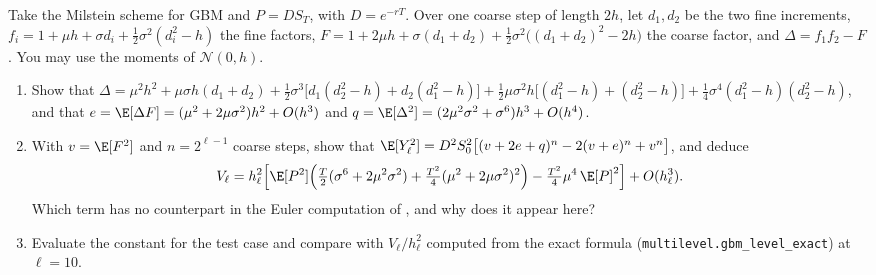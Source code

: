 \begin{exercise}\label{ex:ml-milstein-exact}
\hard Take the Milstein scheme for GBM and $P=DS_T$, with $D=e^{-rT}$. Over one coarse step of
length $2h$, let $d_1,d_2$ be the two fine increments, $f_i=1+\mu h+\sigma d_i+\frac12\sigma^2(d_i^2-h)$
the fine factors, $F=1+2\mu h+\sigma(d_1+d_2)+\frac12\sigma^2\big((d_1+d_2)^2-2h\big)$ the coarse
factor, and $\Delta=f_1f_2-F$. You may use the moments of $\mathcal N(0,h)$.
\begin{enumerate}[label=(\alph*)]
  \item Show that
    $\Delta=\mu^2h^2+\mu\sigma h(d_1+d_2)+\frac12\sigma^3\big[d_1(d_2^2-h)+d_2(d_1^2-h)\big]
    +\frac12\mu\sigma^2h\big[(d_1^2-h)+(d_2^2-h)\big]+\frac14\sigma^4(d_1^2-h)(d_2^2-h)$, and that
    $e=\E[\Delta F]=(\mu^2+2\mu\sigma^2)h^2+O(h^3)$ and $q=\E[\Delta^2]=(2\mu^2\sigma^2+\sigma^6)h^3+O(h^4)$.
  \item With $v=\E[F^2]$ and $n=2^{\ell-1}$ coarse steps, show that
    $\E[Y_\ell^2]=D^2S_0^2\big[(v+2e+q)^n-2(v+e)^n+v^n\big]$, and deduce
    \[
      V_\ell=h_\ell^2\Big[\E[P^2]\Big(\tfrac T2(\sigma^6+2\mu^2\sigma^2)+\tfrac{T^2}4(\mu^2+2\mu\sigma^2)^2\Big)
      -\tfrac{T^2}4\mu^4\,\E[P]^2\Big]+O(h_\ell^3).
    \]
    Which term has no counterpart in the Euler computation of , and why
    does it appear here?
  \item Evaluate the constant for the test case and compare with $V_\ell/h_\ell^2$ computed from the
    exact formula (\texttt{multilevel.gbm\_level\_exact}) at $\ell=10$.
\end{enumerate}
\end{exercise}

